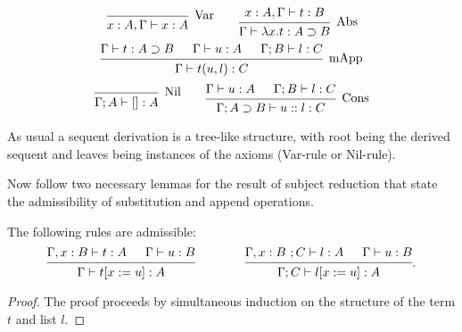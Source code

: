 \begin{definition}
  \[
    \begin{prooftree}
      \infer0[Var]{ x:A, \Gamma \vdash x:A } 
    \end{prooftree}
    \qquad
    \begin{prooftree}
      \hypo{ x:A, \Gamma \vdash t:B }
      \infer1[Abs]{ \Gamma \vdash \lambda x . t : A \supset B  } 
    \end{prooftree}
  \]
  \[
    \begin{prooftree}
      \hypo{ \Gamma \vdash t : A \supset B }
      \hypo{ \Gamma \vdash u : A }
      \hypo{ \Gamma ; B \vdash l : C }	
      \infer3[mApp]{ \Gamma \vdash t(u, l) : C } 
    \end{prooftree}
  \]
  \[
    \begin{prooftree}
      \infer0[Nil]{ \Gamma ; A \vdash []:A } 
    \end{prooftree}
    \qquad
    \begin{prooftree}
      \hypo{ \Gamma \vdash u:A }
      \hypo{ \Gamma ; B \vdash l:C }
      \infer2[Cons]{ \Gamma ; A \supset B \vdash  u::l : C } 
    \end{prooftree}
  \]
\end{definition}

As usual a sequent derivation is a tree-like structure, with root being the derived sequent and leaves being instances of the axioms (Var-rule or Nil-rule).


Now follow two necessary lemmas for the result of subject reduction that state the admissibility of substitution and append operations.

\begin{lemma}
  \label{type_substitution}
  The following rules are admissible:
  \[
    \begin{prooftree}
      \hypo{ \Gamma , x:B \vdash t:A }
      \hypo{ \Gamma \vdash u:B }
      \infer2{ \Gamma \vdash  t[x := u] : A }      
    \end{prooftree}
    \qquad \qquad
    \begin{prooftree}
      \hypo{ \Gamma , x:B \ ; C \vdash l:A }
      \hypo{ \Gamma \vdash u:B }
      \infer2{ \Gamma ; C \vdash  l[x := u] : A }
    \end{prooftree}.
  \]
\end{lemma}
\begin{proof}
  The proof proceeds by simultaneous induction on the structure of the term $t$ and list $l$.
\end{proof}

